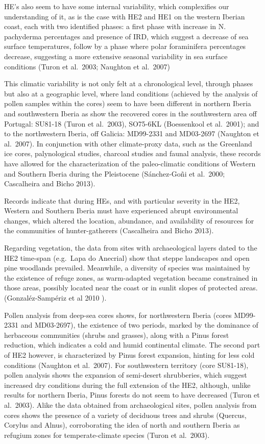 \documentclass[12pt,twoside]{reedthesis}
\begin{document}
HE's also seem to have some internal variability, which complexifies our understanding of it, as is the case with HE2 and HE1 on the western Iberian coast, each with two identified phases: a first phase with increase in N. pachyderma percentages and presence of IRD, which suggest a decrease of sea surface temperatures, follow by a phase where polar foraminifera percentages decrease, suggesting a more extensive seasonal variability in sea surface conditions (Turon et al.~2003; Naughton et al.~2007)

This climatic variability is not only felt at a chronological level, through phases but also at a geographic level, where land conditions (achieved by the analysis of pollen samples within the cores) seem to have been different in northern Iberia and southwestern Iberia as show the recovered cores in the southwestern area off Portugal: SU81-18 (Turon et al.~2003), SO75-6KL (Boessenkool et al.~2001); and to the northwestern Iberia, off Galicia: MD99-2331 and MD03-2697 (Naughton et al.~2007). In conjunction with other climate-proxy data, such as the Greenland ice cores, palynological studies, charcoal studies and faunal analysis, these records have allowed for the characterization of the paleo-climatic conditions of Western and Southern Iberia during the Pleistocene (Sánchez-Goñi et al.~2000; Cascalheira and Bicho 2013).

Records indicate that during HEs, and with particular severity in the HE2, Western and Southern Iberia must have experienced abrupt environmental changes, which altered the location, abundance, and availability of resources for the communities of hunter-gatherers (Cascalheira and Bicho 2013).

Regarding vegetation, the data from sites with archaeological layers dated to the HE2 time-span (e.g.~Lapa do Anecrial) show that steppe landscapes and open pine woodlands prevailed. Meanwhile, a diversity of species was maintained by the existence of refuge zones, as warm-adapted vegetation became constrained in those areas, possibly located near the coast or in sunlit slopes of protected areas. (Gonzaléz-Sampériz et al 2010 ).

Pollen analysis from deep-sea cores shows, for northwestern Iberia (cores MD99-2331 and MD03-2697), the existence of two periods, marked by the dominance of herbaceous communities (shrubs and grasses), along with a Pinus forest reduction, which indicates a cold and humid continental climate. The second part of HE2 however, is characterized by Pinus forest expansion, hinting for less cold conditions (Naughton et al.~2007). For southwestern territory (core SU81-18), pollen analysis shows the expansion of semi-desert shrubberies, which suggest increased dry conditions during the full extension of the HE2, although, unlike results for northern Iberia, Pinus forests do not seem to have decreased (Turon et al.~2003). Alike the data obtained from archaeological sites, pollen analysis from cores shows the presence of a variety of deciduous trees and shrubs (Quercus, Corylus and Alnus), corroborating the idea of north and southern Iberia as refugium zones for temperate-climate species (Turon et al.~2003).
\end{document}
